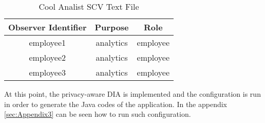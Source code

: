 \begin{table}[h!]
\centering
	\begin{tabular}{||c|c|c||} 
	\hline\hline
	Observer Identifier & Purpose & Role \\ [1ex] 
	\hline\hline
	employee1 & analytics & employee \\
	\hline
	employee2 & analytics & employee \\
	\hline
	employee3 & analytics & employee \\
	\hline\hline
	\end{tabular}
\caption{Cool Analist SCV Text File}
\label{Cool Analist SCV Text File}
\end{table}

At this point, the privacy-aware DIA is implemented and the configuration is run in order to generate the Java codes of the application. In the appendix \ref{sec:Appendix3} can be seen how to run such configuration.

